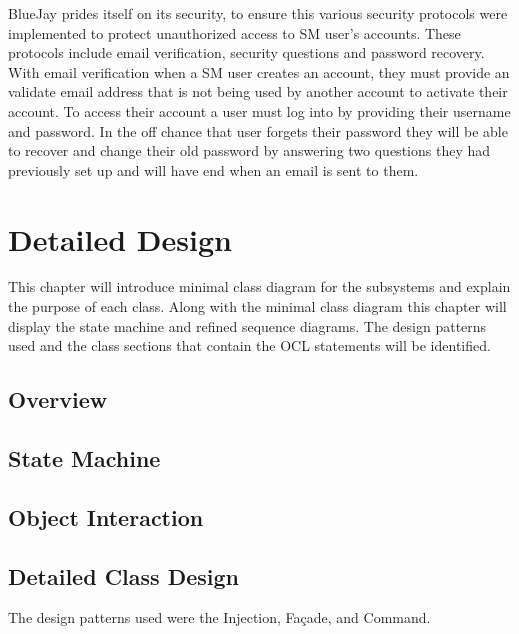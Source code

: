 \documentclass{report}
\begin{document}
BlueJay prides itself on its security,
to ensure this various security protocols were implemented to protect unauthorized access to SM user’s accounts.
These protocols include email verification, security questions and password recovery.
With email verification when a SM user creates an account, they must provide an validate email address that is not being used by another account to activate their account.
To access their account a user must log into by providing their username and password.
In the off chance that user forgets their password they will be able to recover and change their old password by answering two questions they had previously set up and will have end when an email is sent to them.\\





\chapter{Detailed Design}
This chapter will introduce minimal class diagram for the subsystems and explain the purpose of each class. Along with the minimal class diagram this chapter will display the state machine and refined sequence diagrams. The design patterns used and the class sections that contain the OCL statements will be identified.\\
\section{Overview}
\section{State Machine}
\section{Object Interaction}
\section{Detailed Class Design}
The design patterns used were the Injection, Façade, and Command.
\end{document}
